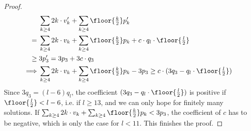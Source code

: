 \begin{proposition}
\begin{proof}
    \begin{align*}
      &\sum_{k \geq 4} 2k \cdot v'_k + \sum_{k \geq 4} \floor{\tfrac{k}{2}} p'_k \\
      ={}&\sum_{k \geq 4} 2k \cdot v_k + \sum_{k \geq 4} \floor{\tfrac{k}{2}} p_k + c \cdot q_l \cdot \floor{\tfrac{l}{2}}\\
      \geq{} & 3 p'_3 {}={} 3 p_3 + 3 c \cdot q_3 \\
      \implies & \sum_{k \geq 4} 2k \cdot v_k + \sum_{k \geq 4} \floor{\tfrac{k}{2}} p_k - 3p_3 \geq c \cdot (3 q_3 - q_l \cdot \floor{\tfrac{l}{2}})
    \end{align*}
    Since $3q_3 = (l - 6)q_l$, the coefficient $(3 q_3 - q_l \cdot \floor{\tfrac{l}{2}})$ is positive if $\floor{\frac{l}{2}} < l - 6$, i.e. if $l \geq 13$, and we can only hope for finitely many solutions. If $\sum_{k \geq 4} 2k \cdot v_k + \sum_{k \geq 4} \floor{\tfrac{k}{2}} p_k < 3p_3$, the coefficient of $c$ has to be negative, which is only the case for $l < 11$. This finishes the proof.
  \end{proof}
\end{proposition}

